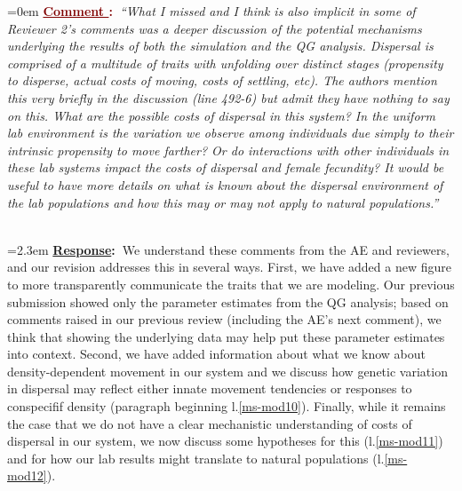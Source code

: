 \documentclass[12pt]{article}
\newcounter{cN}
\newcommand{\comment}[1]{
	\vspace{2em}
	\refstepcounter{cN} %
	\noindent \hangindent=0em \textbf{\textcolor{Maroon}{\uline{Comment \thecN}:~}}\emph{``#1''}
	}
\newcommand{\response}[1]{
	\\[0.25em]
	\hangindent=2.3em \textbf{\textcolor{NavyBlue}{\uline{Response}:~}}#1
	}
\begin{document}
\comment{What I missed and I think is also implicit in some of Reviewer 2’s comments was a deeper discussion of the potential mechanisms underlying the results of both the simulation and the QG analysis.
Dispersal is comprised of a multitude of traits with unfolding over distinct stages (propensity to disperse, actual costs of moving, costs of settling, etc).
The authors mention this very briefly in the discussion (line 492-6) but admit they have nothing to say on this.
What are the possible costs of dispersal in this system?
In the uniform lab environment is the variation we observe among individuals due simply to their intrinsic propensity to move farther?
Or do interactions with other individuals in these lab systems impact the costs of dispersal and female fecundity?
It would be useful to have more details on what is known about the dispersal environment of the lab populations and how this may or may not apply to natural populations.}
\response{We understand these comments from the AE and reviewers, and our revision addresses this in several ways. 
First, we have added a new figure to more transparently communicate the traits that we are modeling.
Our previous submission showed only the parameter estimates from the QG analysis; based on comments raised in our previous review (including the AE's next comment), we think that showing the underlying data may help put these parameter estimates into context.
Second, we have added information about what we know about density-dependent movement in our system and we discuss how genetic variation in dispersal may reflect either innate movement tendencies or responses to conspecifif density (paragraph beginning l.\ref{ms-mod10}).
Finally, while it remains the case that we do not have a clear mechanistic understanding of costs of dispersal in our system, we now discuss some hypotheses for this (l.\ref{ms-mod11}) and for how our lab results might translate to natural populations (l.\ref{ms-mod12}).
}
\end{document}
